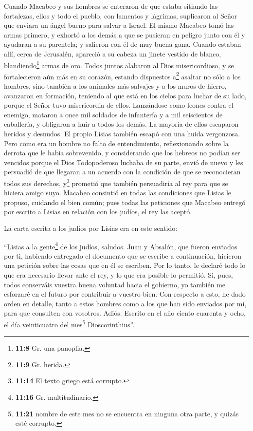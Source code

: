  Cuando Macabeo y sus hombres se enteraron de que estaba
sitiando las fortalezas, ellos y todo el pueblo, con lamentos y
lágrimas, suplicaron al Señor que enviara un ángel bueno para salvar a
Israel.  El mismo Macabeo tomó las armas primero, y
exhortó a los demás a que se pusieran en peligro junto con él y ayudaran
a su parentela; y salieron con él de muy buena gana. 
Cuando estaban allí, cerca de Jerusalén, apareció a su cabeza un jinete
vestido de blanco, blandiendo\footnote{\textbf{11:8} Gr. una panoplia.}
armas de oro.  Todos juntos alabaron al Dios
misericordioso, y se fortalecieron aún más en su corazón, estando
dispuestos a\footnote{\textbf{11:9} Gr. herida.} asaltar no sólo a los
hombres, sino también a los animales más salvajes y a los muros de
hierro,  avanzaron en formación, teniendo al que está en
los cielos para luchar de su lado, porque el Señor tuvo misericordia de
ellos.  Lanzándose como leones contra el enemigo, mataron
a once mil soldados de infantería y a mil seiscientos de caballería, y
obligaron a huir a todos los demás.  La mayoría de ellos
escaparon heridos y desnudos. El propio Lisias también escapó con una
huida vergonzosa.  Pero como era un hombre no falto de
entendimiento, reflexionando sobre la derrota que le había sobrevenido,
y considerando que los hebreos no podían ser vencidos porque el Dios
Todopoderoso luchaba de su parte, envió de nuevo  y les
persuadió de que llegaran a un acuerdo con la condición de que se
reconocieran todos sus derechos, y\footnote{\textbf{11:14} El texto
  griego está corrupto.} prometió que también persuadiría al rey para
que se hiciera amigo suyo.  Macabeo consintió en todas
las condiciones que Lisias le propuso, cuidando el bien común; pues
todas las peticiones que Macabeo entregó por escrito a Lisias en
relación con los judíos, el rey las aceptó.

 La carta escrita a los judíos por Lisias era en este
sentido:

``Lisias a la gente\footnote{\textbf{11:16} Gr. multitudinario.} de los
judíos, saludos.  Juan y Absalón, que fueron enviados por
ti, habiendo entregado el documento que se escribe a continuación,
hicieron una petición sobre las cosas que en él se escriben.
 Por lo tanto, le declaré todo lo que era necesario
llevar ante el rey, y lo que era posible lo permitió. 
Si, pues, todos conserváis vuestra buena voluntad hacia el gobierno, yo
también me esforzaré en el futuro por contribuir a vuestro bien.
 Con respecto a esto, he dado orden en detalle, tanto a
estos hombres como a los que han sido enviados por mí, para que
consulten con vosotros.  Adiós. Escrito en el año ciento
cuarenta y ocho, el día veinticuatro del mes\footnote{\textbf{11:21}
  nombre de este mes no se encuentra en ninguna otra parte, y quizás
  esté corrupto.} Dioscorinthius''.

